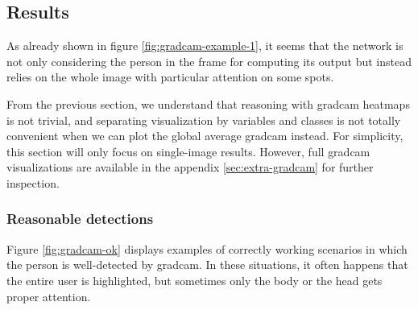 \subsection{Results}
\label{subsec:gradcam-results}

As already shown in figure \ref{fig:gradcam-example-1}, it seems that the network is not only considering the person in the frame for computing its output but instead relies on the whole image with particular attention on some spots.

From the previous section, we understand that reasoning with \gls{gradcam} heatmaps is not trivial, and separating visualization by variables and classes is not totally convenient when we can plot the global average \gls{gradcam} instead. For simplicity, this section will only focus on single-image results. However, full \gls{gradcam} visualizations are available in the appendix \ref{sec:extra-gradcam} for further inspection.

\subsubsection*{Reasonable detections}

Figure \ref{fig:gradcam-ok} displays examples of correctly working scenarios in which the person is well-detected by \gls{gradcam}. In these situations, it often happens that the entire user is highlighted, but sometimes only the body or the head gets proper attention.

